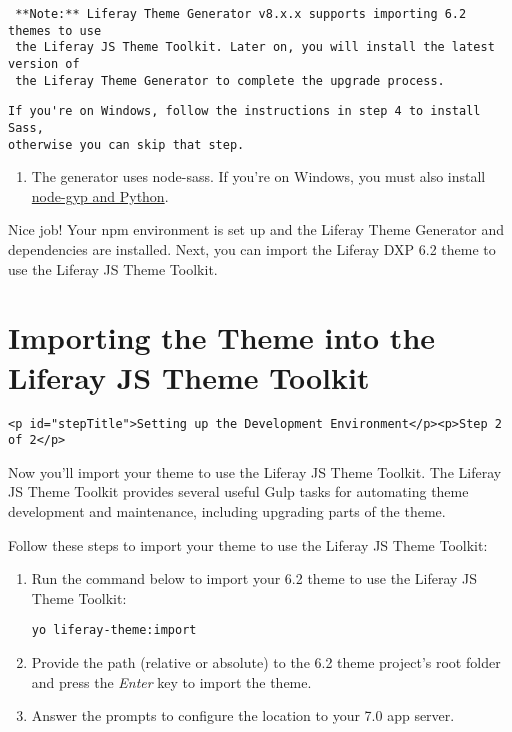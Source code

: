 \noindent\hrulefill

\begin{verbatim}
 **Note:** Liferay Theme Generator v8.x.x supports importing 6.2 themes to use 
 the Liferay JS Theme Toolkit. Later on, you will install the latest version of 
 the Liferay Theme Generator to complete the upgrade process.
\end{verbatim}

\noindent\hrulefill

\begin{verbatim}
If you're on Windows, follow the instructions in step 4 to install Sass, 
otherwise you can skip that step.
\end{verbatim}

\begin{enumerate}
\def\labelenumi{\arabic{enumi}.}
\setcounter{enumi}{3}
\tightlist
\item
  The generator uses node-sass. If you're on Windows, you must also
  install
  \href{https://github.com/nodejs/node-gyp\#installation}{node-gyp and
  Python}.
\end{enumerate}

Nice job! Your npm environment is set up and the Liferay Theme Generator
and dependencies are installed. Next, you can import the Liferay DXP 6.2
theme to use the Liferay JS Theme Toolkit.

\chapter{Importing the Theme into the Liferay JS Theme
Toolkit}\label{importing-the-theme-into-the-liferay-js-theme-toolkit}

\begin{verbatim}
<p id="stepTitle">Setting up the Development Environment</p><p>Step 2 of 2</p>
\end{verbatim}

Now you'll import your theme to use the Liferay JS Theme Toolkit. The
Liferay JS Theme Toolkit provides several useful Gulp tasks for
automating theme development and maintenance, including upgrading parts
of the theme.

Follow these steps to import your theme to use the Liferay JS Theme
Toolkit:

\begin{enumerate}
\def\labelenumi{\arabic{enumi}.}
\item
  Run the command below to import your 6.2 theme to use the Liferay JS
  Theme Toolkit:

\begin{verbatim}
yo liferay-theme:import
\end{verbatim}
\item
  Provide the path (relative or absolute) to the 6.2 theme project's
  root folder and press the \emph{Enter} key to import the theme.
\item
  Answer the prompts to configure the location to your 7.0 app server.
\end{enumerate}

